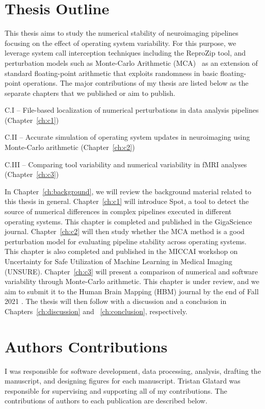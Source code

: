 \section{Thesis Outline}

This thesis aims to study the numerical stability of neuroimaging pipelines focusing on the effect
of operating system variability. For this purpose, we leverage system call interception techniques including the
ReproZip tool, and perturbation models such as Monte-Carlo Arithmetic (MCA)~\cite{Parker1997-qq} as an extension of
standard floating-point arithmetic that exploits randomness in basic floating-point operations. The major
contributions of my thesis are listed below as the separate chapters that we published or aim to publish.

C.I – File-based localization of numerical perturbations in data analysis pipelines (Chapter~\ref{ch:c1})

C.II – Accurate simulation of operating system updates in neuroimaging using Monte-Carlo arithmetic (Chapter~\ref{ch:c2})

C.III – Comparing tool variability and numerical variability in fMRI analyses (Chapter~\ref{ch:c3})


In Chapter~\ref{ch:background}, we will review the background material related to this thesis in general.
Chapter~\ref{ch:c1} will introduce Spot, a tool to detect the source of numerical differences in complex pipelines
executed in different operating systems. This chapter is completed and published in the
GigaScience journal. Chapter~\ref{ch:c2} will then study whether the MCA method is a good perturbation
model for evaluating pipeline stability across operating systems. This chapter is also completed and published
in the MICCAI workshop on Uncertainty for Safe Utilization of Machine Learning in Medical Imaging (UNSURE).
Chapter~\ref{ch:c3} will present a comparison of numerical and software variability through Monte-Carlo arithmetic.
This chapter is under review, and we aim to submit it to the Human Brain Mapping (HBM) journal by the end of Fall 2021 .
The thesis will then follow with a discussion and a conclusion in Chapters~\ref{ch:discussion} and ~\ref{ch:conclusion}, respectively.



\section{Authors Contributions}

I was responsible for software development, data processing, analysis, drafting the manuscript, and designing figures for each manuscript. 
Tristan Glatard was responsible for supervising and supporting all of my contributions.
The contributions of authors to each publication are described below.

